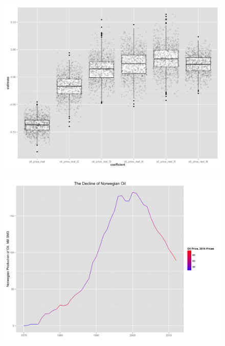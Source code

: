 \documentclass{beamer}
\begin{document}
\begin{frame}[plain]
	\begin{figure}
	\includegraphics[width=1\textwidth]{glm_dirty_box.png}
	\end{figure}
\end{frame}

\begin{frame}[plain]
	\begin{figure}
	\includegraphics[width=1\textwidth]{oil_decline.png}
	\end{figure}
\end{frame}

\end{document}
